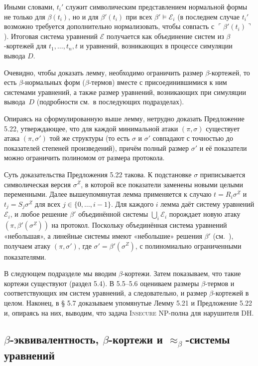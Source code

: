 Иными словами,
$t_i'$ служит символическим представлением нормальной формы не только
для $\beta(t_i)$, но и для $\beta'(t_i)$ при всех $\beta'\models\mathcal E_i$
(в последнем случае $t_i'$ возможно требуется дополнительно нормализовать,
чтобы совпасть с $\ulcorner\beta'(t_i)\urcorner$).
Итоговая система уравнений $\mathcal E$
получается как объединение систем
из $\beta$-кортежей для $t_1,\dots,t_n,t$
и уравнений, возникающих в процессе симуляции вывода $D$.

Очевидно, чтобы доказать лемму, необходимо ограничить размер
$\beta$-кортежей, то есть $\beta$-нормальных форм
($\beta$-термов) вместе с присоединившимися к ним системами
уравнений, а также размер уравнений, возникающих при симуляции
вывода~$D$ (подробности см.\ в последующих подразделах).

Опираясь на сформулированную выше лемму, нетрудно доказать
Предложение 5.22, утверждающее, что для каждой минимальной атаки
$(\pi,\sigma)$ существует атака $(\pi,\sigma')$ той же структуры
(то есть $\sigma$ и $\sigma'$ совпадают с точностью до показателей
степеней произведений), причём полный размер $\sigma'$
и её показатели можно ограничить полиномом от размера протокола.

Суть доказательства Предложения 5.22 такова.
К подстановке $\sigma$ приписывается символическая версия
$\sigma^{Z}$, в которой все показатели заменены новыми целыми
переменными. Далее вышеупомянутая лемма применяется к случаю
$t=R_{i}\sigma^{Z}$ и $t_{j}=S_{j}\sigma^{Z}$ для всех
$j\in\{0,\dots,i-1\}$.
Для каждого $i$ лемма даёт систему уравнений $\mathcal E_{i}$, и
любое решение $\beta'$ объединённой системы
$\bigcup_{i}\mathcal E_{i}$ порождает новую атаку
\((\pi,\beta'(\sigma^{Z}))\) на протокол.
Поскольку объединённая система уравнений «небольшая», а линейные
системы имеют «небольшие» решения $\beta'$
(см.\ \cite{Bockmayr2001}), получаем атаку
$(\pi,\sigma')$, где $\sigma'=\beta'(\sigma^{Z})$, с
полиномиально ограниченными показателями.

В следующем подразделе мы вводим $\beta$-кортежи. Затем
показываем, что такие кортежи существуют (раздел 5.4).
В 5.5–5.6 оцениваем размеры $\beta$-термов и соответствующих им
систем уравнений, а следовательно, и размер $\beta$-кортежей в целом.
Наконец, в § 5.7 доказываем упомянутые Лемму 5.21 и
Предложение 5.22 и, опираясь на них, выводим, что задача
\textsc{Insecure} NP-полна для нарушителя DH.

\subsection{$\beta$-эквивалентность, $\beta$-кортежи и $\approx_{\beta}$-системы уравнений}

